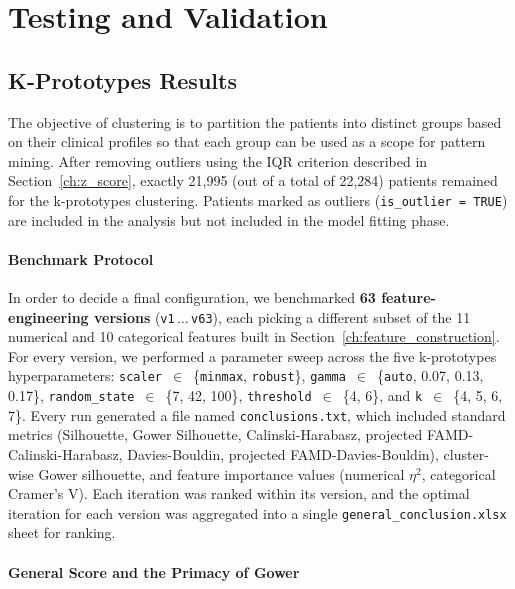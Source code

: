 \chapter{Testing and Validation}
\label{ch:testing}

\section{K-Prototypes Results}
\label{ch:results_clustering}

The objective of clustering is to partition the patients into distinct groups based on their clinical profiles so that each group can be used as a scope for pattern mining. After removing outliers using the IQR criterion described in Section~\ref{ch:z_score}, exactly 21,995 (out of a total of 22,284) patients remained for the k-prototypes clustering. Patients marked as outliers (\texttt{is\_outlier = TRUE}) are included in the analysis but not included in the model fitting phase.

\subsubsection*{Benchmark Protocol}

In order to decide a final configuration, we benchmarked \textbf{63 feature-engineering versions} (\texttt{v1}\,$\ldots$\,\texttt{v63}), each picking a different subset of the 11 numerical and 10 categorical features built in Section~\ref{ch:feature_construction}. For every version, we performed a parameter sweep across the five k-prototypes hyperparameters: \texttt{scaler}~$\in$~\{\texttt{minmax}, \texttt{robust}\}, \texttt{gamma}~$\in$~\{\texttt{auto}, 0.07, 0.13, 0.17\}, \texttt{random\_state}~$\in$~\{7, 42, 100\}, \texttt{threshold}~$\in$~\{4, 6\}, and \texttt{k}~$\in$~\{4, 5, 6, 7\}. Every run generated a file named \texttt{conclusions.txt}, which included standard metrics (Silhouette, Gower Silhouette, Calinski-Harabasz, projected FAMD-Calinski-Harabasz, Davies-Bouldin, projected FAMD-Davies-Bouldin), cluster-wise Gower silhouette, and feature importance values (numerical $\eta^2$, categorical Cramer's V). Each iteration was ranked within its version, and the optimal iteration for each version was aggregated into a single \texttt{general\_conclusion.xlsx} sheet for ranking.

\subsubsection*{General Score and the Primacy of Gower}

